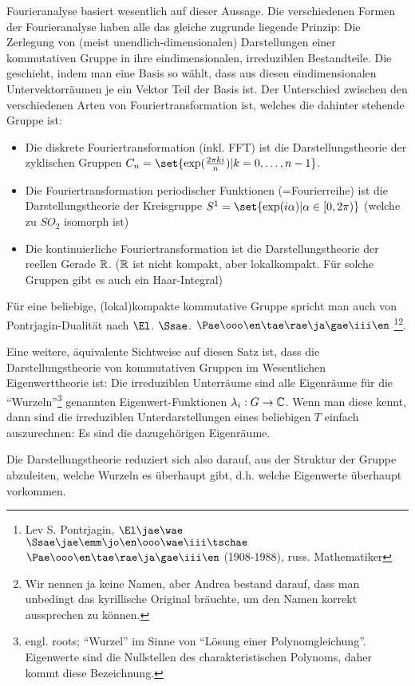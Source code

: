 \begin{remark}
Fourieranalyse basiert wesentlich auf dieser Aussage. Die verschiedenen Formen der Fourieranalyse haben alle das gleiche zugrunde liegende Prinzip: Die Zerlegung von (meist unendlich-dimensionalen) Darstellungen einer kommutativen Gruppe in ihre eindimensionalen, irreduziblen Bestandteile. Die geschieht, indem man eine Basis so wählt, dass aus diesen eindimensionalen Untervektorräumen je ein Vektor Teil der Basis ist. Der Unterschied zwischen den verschiedenen Arten von Fouriertransformation ist, welches die dahinter stehende Gruppe ist:

\begin{itemize}
\item Die diskrete Fouriertransformation (inkl. FFT) ist die Darstellungstheorie der zyklischen Gruppen $C_n = \set{\exp(\frac{2\pi k i}{n}) | k=0,\ldots,n-1}$.
\item Die Fouriertransformation periodischer Funktionen (=Fourierreihe) ist die Darstellungstheorie der Kreisgruppe $S^1 = \set{\exp(i\alpha) | \alpha\in[0,2\pi)}$ (welche zu $SO_2$ isomorph ist)
\item Die kontinuierliche Fouriertransformation ist die Darstellungstheorie der reellen Gerade $\mathbb{R}$. ($\mathbb{R}$ ist nicht kompakt, aber lokalkompakt. Für solche Gruppen gibt es auch ein Haar-Integral)
\end{itemize}

Für eine beliebige, (lokal)kompakte kommutative Gruppe spricht man auch von Pontrjagin-Dualität nach $\El$. $\Ssae$. $\Pae\ooo\en\tae\rae\ja\gae\iii\en$
\footnote{Lev S. Pontrjagin, $\El\jae\wae$ $\Ssae\jae\emm\jo\en\ooo\wae\iii\tschae$ $\Pae\ooo\en\tae\rae\ja\gae\iii\en$ (1908-1988), russ. Mathematiker}\footnote{Wir nennen ja keine Namen, aber Andrea bestand darauf, dass man unbedingt das kyrillische Original bräuchte, um den Namen korrekt aussprechen zu können.}.
\end{remark}

\begin{remark}
Eine weitere, äquivalente Sichtweise auf diesen Satz ist, dass die Darstellungstheorie von kommutativen Gruppen im Wesentlichen Eigenwerttheorie ist: Die irreduziblen Unterräume sind alle Eigenräume für die \enquote{Wurzeln}\footnote{engl. roots; \enquote{Wurzel} im Sinne von \enquote{Lösung einer Polynomgleichung}. Eigenwerte sind die Nullstellen des charakteristischen Polynoms, daher kommt diese Bezeichnung.} genannten Eigenwert-Funktionen $\lambda_i: G\to\mathbb{C}$. Wenn man diese kennt, dann sind die irreduziblen Unterdarstellungen eines beliebigen $T$ einfach auszurechnen: Es sind die dazugehörigen Eigenräume.

Die Darstellungstheorie reduziert sich also darauf, aus der Struktur der Gruppe abzuleiten, welche Wurzeln es überhaupt gibt, d.h. welche Eigenwerte überhaupt vorkommen.
\end{remark}

